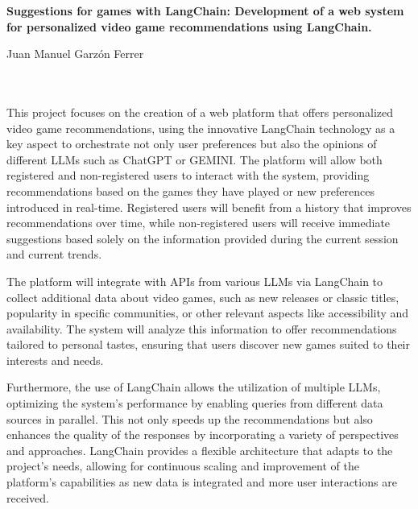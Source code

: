 \newpage
\begin{center}
{\large\bfseries Suggestions for games with LangChain: Development of a web system for personalized video game recommendations using LangChain.}\\
\end{center}
\begin{center}
Juan Manuel Garzón Ferrer\\
\end{center}

\\

\vspace{0.7cm}
\\

This project focuses on the creation of a web platform that offers personalized video game recommendations, using the innovative LangChain technology as a key aspect to orchestrate not only user preferences but also the opinions of different LLMs such as ChatGPT or GEMINI. The platform will allow both registered and non-registered users to interact with the system, providing recommendations based on the games they have played or new preferences introduced in real-time. Registered users will benefit from a history that improves recommendations over time, while non-registered users will receive immediate suggestions based solely on the information provided during the current session and current trends.

The platform will integrate with APIs from various LLMs via LangChain to collect additional data about video games, such as new releases or classic titles, popularity in specific communities, or other relevant aspects like accessibility and availability. The system will analyze this information to offer recommendations tailored to personal tastes, ensuring that users discover new games suited to their interests and needs.

Furthermore, the use of LangChain allows the utilization of multiple LLMs, optimizing the system's performance by enabling queries from different data sources in parallel. This not only speeds up the recommendations but also enhances the quality of the responses by incorporating a variety of perspectives and approaches. LangChain provides a flexible architecture that adapts to the project's needs, allowing for continuous scaling and improvement of the platform’s capabilities as new data is integrated and more user interactions are received.



